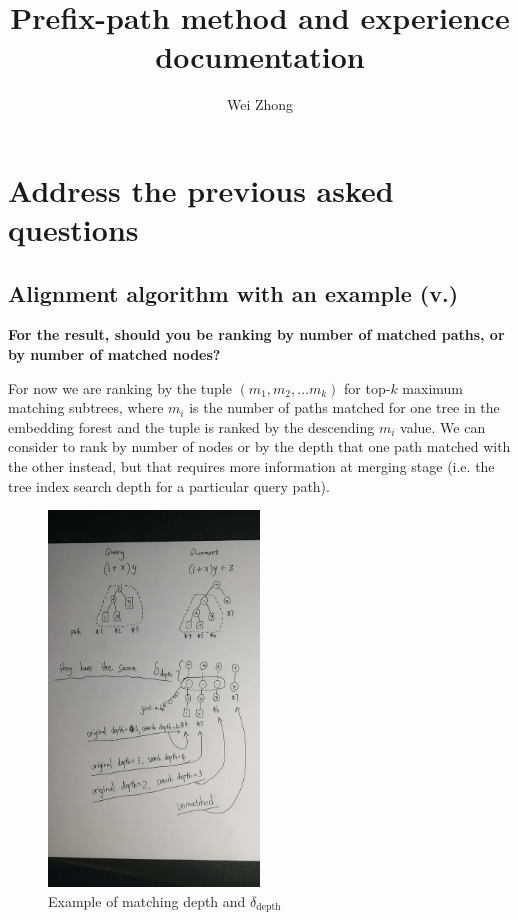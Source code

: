 \documentclass[a4paper]{article}
\title{Prefix-path method and experience documentation}
\author{Wei Zhong}
\begin{document}
\maketitle

\section{Address the previous asked questions}

\subsection{Alignment algorithm with an example (v.)}
\textbf{ For the result, should you be ranking by number of matched paths, or by number of matched nodes?  }

For now we are ranking by the tuple $(m_1, m_2, ... m_k)$ for top-$k$ maximum matching subtrees, where $m_i$ is the number of paths matched for one tree in the embedding forest and the tuple is ranked by the descending $m_i$ value. We can consider to rank by number of nodes or by the depth that one path matched with the other instead, but that requires more information at merging stage (i.e. the tree index search depth for a particular query path). 

\begin{figure}
\centering
\includegraphics[width=0.5\textwidth]{easyforu.jpg}
\caption{\label{fig:frog}Example of matching depth and $\delta_\text{depth}$}
\end{figure}
\end{document}
